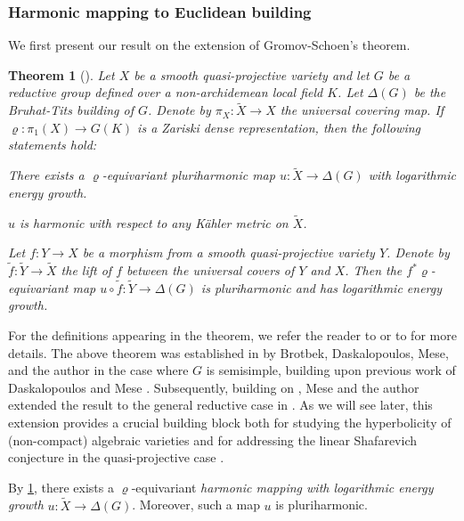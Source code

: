 \documentclass[english]{amsproc}
\theoremstyle{plain}
\newtheorem{thm}{Theorem}[section]
\theoremstyle{definition}
\theoremstyle{remark}
\theoremstyle{plain}
\numberwithin{equation}{thm} %
\begin{document}
\subsubsection{Harmonic mapping to Euclidean building} 
We first present our result on the extension of Gromov-Schoen's theorem. 
\begin{thm}[\cite{BDDM,DM24}] \label{thm:BDDMex} 
	Let $X$ be a smooth quasi-projective variety and let $G$ be a reductive group defined over a non-archidemean local field $K$. Let $\Delta(G)$ be  the  Bruhat-Tits building of $G$. Denote by  $\pi_X:\widetilde{X}\to X$ the universal covering map.   If $\varrho:\pi_1(X)\to G(K)$ is a Zariski dense representation, then the following statements hold:
	\begin{thmlist}
		\item  \label{item:existence}  There exists a $\varrho$-equivariant pluriharmonic map $u:\widetilde{X}\to \Delta(G)$ with  logarithmic energy growth. 
		\item \label{item:harmonic}$ {u}$ is harmonic with respect to any K\"ahler metric on $\widetilde{X}$.  	
		\item  \label{item:pullback}Let $f: Y \to X$ be a morphism from a smooth quasi-projective variety $Y$. Denote by $\tilde{f}: \widetilde{Y} \to \widetilde{X}$   the lift of $f$ between the universal covers of $Y$ and $X$.  Then the $f^*\varrho$-equivariant map $ {u }\circ \tilde{f}: \widetilde{Y} \to \Delta(G)$ is   pluriharmonic and has logarithmic energy growth.  
	\end{thmlist} 
\end{thm} 
For the definitions appearing in the theorem, 
we refer the reader to \cite{BDDM} or to \cite[Section~2]{DM24} for more details. 
The above theorem was established in \cite[Theorem~A]{BDDM} by 
Brotbek, Daskalopoulos, Mese, and the  author in the case where $G$ is semisimple, building upon previous work of Daskalopoulos and Mese \cite{DM23J,DM24A,DM23M}.
Subsequently, building on \cite{BDDM}, 
 Mese and the author extended the result to the general reductive case 
in \cite[Theorem~A]{DM24}. 
As we will see later, this extension provides a crucial building block both for studying the hyperbolicity of 
(non-compact) algebraic varieties \cite{CDY22} and for addressing the  linear Shafarevich conjecture in the 
quasi-projective case \cite{DY23,DY23b,Bru23,BBT24}.

By \cref{thm:BDDMex}, there exists a $\varrho$-equivariant \emph{harmonic mapping with logarithmic energy growth} $u:\widetilde{X}\to \Delta(G)$.  
Moreover, such a map $u$ is pluriharmonic.  
\end{document}
